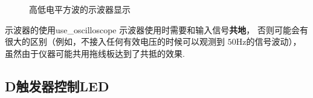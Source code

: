 \documentclass[11pt]{SEU-Digital-Report}
\begin{document}
            \begin{figure}[htbp]
                \centering
                \caption{高低电平方波的示波器显示}
                \label{fig:square_wave}
            \end{figure}

            \begin{note}{示波器的使用}{use_oscilloscope}
                示波器使用时需要和输入信号\textbf{共地}，
                否则可能会有很大的区别（例如，不接入任何有效电压的时候可以观测到 $50\mathrm{Hz}$的信号波动），虽然由于仪器可能共用拖线板达到了共抵的效果.
            \end{note}

        \subsection{D触发器控制LED}
\end{document}
